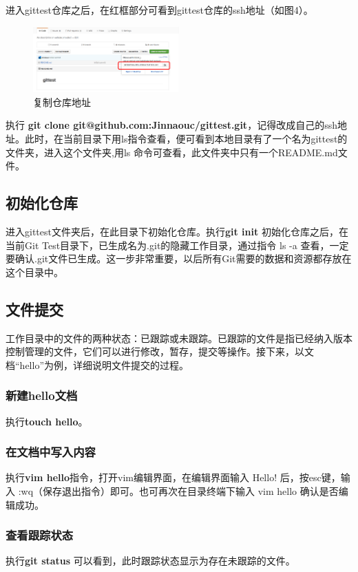 \documentclass{article}
\begin{document}
进入gittest仓库之后，在红框部分可看到gittest仓库的ssh地址（如图4）。

\begin{figure}[!htb] %
\centering \includegraphics[width=0.5\textwidth]{fig4.png} \caption{复制仓库地址}
\label{fig:1}
\end{figure}

执行 \textbf{git clone git@github.com:Jinnaouc/gittest.git}，记得改成自己的ssh地址。此时，在当前目录下用ls指令查看，便可看到本地目录有了一个名为gittest的文件夹，进入这个文件夹,用ls 命令可查看，此文件夹中只有一个README.md文件。

\subsection{初始化仓库}
进入gittest文件夹后，在此目录下初始化仓库。执行\textbf{git init} 初始化仓库之后，在当前Git Test目录下，已生成名为.git的隐藏工作目录，通过指令 ls -a 查看，一定要确认.git文件已生成。这一步非常重要，以后所有Git需要的数据和资源都存放在这个目录中。

\subsection{文件提交}
工作目录中的文件的两种状态：已跟踪或未跟踪。已跟踪的文件是指已经纳入版本控制管理的文件，它们可以进行修改，暂存，提交等操作。接下来，以文档“hello”为例，详细说明文件提交的过程。
\subsubsection{新建hello文档}
执行\textbf{touch hello}。
\subsubsection{在文档中写入内容}
执行\textbf{vim hello}指令，打开vim编辑界面，在编辑界面输入 Hello! 后，按esc键，输入 :wq（保存退出指令）即可。也可再次在目录终端下输入 vim hello 确认是否编辑成功。
\subsubsection{查看跟踪状态}
执行\textbf{git status} 可以看到，此时跟踪状态显示为存在未跟踪的文件。
\end{document}
